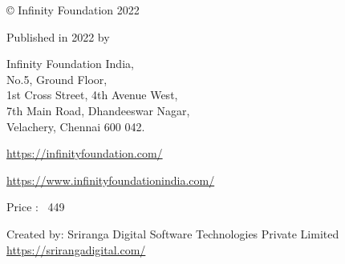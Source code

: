 \thispagestyle{empty}

© Infinity Foundation 2022

Published in 2022 by

Infinity Foundation India,\\ No.5, Ground Floor,\\ 1st Cross Street, 4th Avenue West,\\ 7th Main Road, Dhandeeswar Nagar,\\ Velachery, Chennai 600 042.

\url{https://infinityfoundation.com/}

\url{https://www.infinityfoundationindia.com/}

\bigskip



\bigskip

Price : {\rupee~449}


Created by: Sriranga Digital Software Technologies Private Limited
\url{https://srirangadigital.com/}









